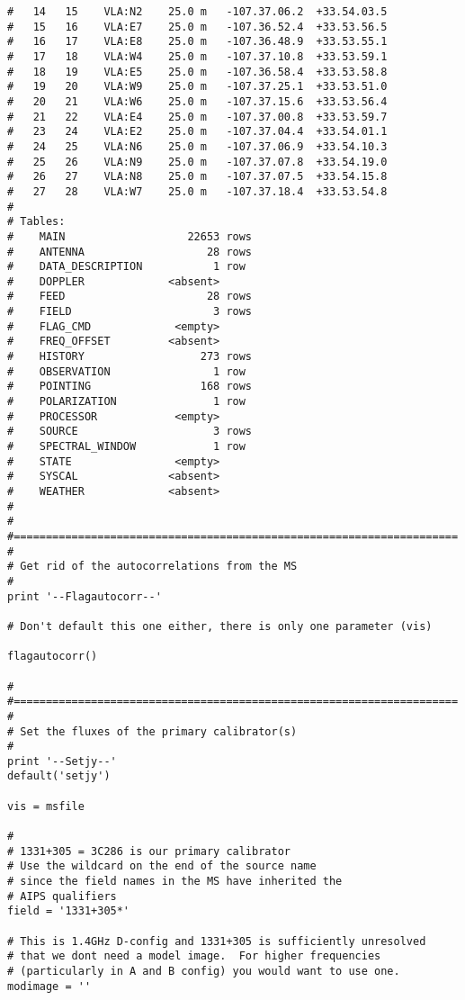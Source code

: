 \begin{verbatim}
#   14   15    VLA:N2    25.0 m   -107.37.06.2  +33.54.03.5  
#   15   16    VLA:E7    25.0 m   -107.36.52.4  +33.53.56.5  
#   16   17    VLA:E8    25.0 m   -107.36.48.9  +33.53.55.1  
#   17   18    VLA:W4    25.0 m   -107.37.10.8  +33.53.59.1  
#   18   19    VLA:E5    25.0 m   -107.36.58.4  +33.53.58.8  
#   19   20    VLA:W9    25.0 m   -107.37.25.1  +33.53.51.0  
#   20   21    VLA:W6    25.0 m   -107.37.15.6  +33.53.56.4  
#   21   22    VLA:E4    25.0 m   -107.37.00.8  +33.53.59.7  
#   23   24    VLA:E2    25.0 m   -107.37.04.4  +33.54.01.1  
#   24   25    VLA:N6    25.0 m   -107.37.06.9  +33.54.10.3  
#   25   26    VLA:N9    25.0 m   -107.37.07.8  +33.54.19.0  
#   26   27    VLA:N8    25.0 m   -107.37.07.5  +33.54.15.8  
#   27   28    VLA:W7    25.0 m   -107.37.18.4  +33.53.54.8  
# 
# Tables:
#    MAIN                   22653 rows     
#    ANTENNA                   28 rows     
#    DATA_DESCRIPTION           1 row      
#    DOPPLER             <absent>  
#    FEED                      28 rows     
#    FIELD                      3 rows     
#    FLAG_CMD             <empty>  
#    FREQ_OFFSET         <absent>  
#    HISTORY                  273 rows     
#    OBSERVATION                1 row      
#    POINTING                 168 rows     
#    POLARIZATION               1 row      
#    PROCESSOR            <empty>  
#    SOURCE                     3 rows     
#    SPECTRAL_WINDOW            1 row      
#    STATE                <empty>  
#    SYSCAL              <absent>  
#    WEATHER             <absent>  
# 
#
#=====================================================================
#
# Get rid of the autocorrelations from the MS
#
print '--Flagautocorr--'

# Don't default this one either, there is only one parameter (vis)

flagautocorr()

#
#=====================================================================
#
# Set the fluxes of the primary calibrator(s)
#
print '--Setjy--'
default('setjy')

vis = msfile

#
# 1331+305 = 3C286 is our primary calibrator
# Use the wildcard on the end of the source name
# since the field names in the MS have inherited the
# AIPS qualifiers
field = '1331+305*'

# This is 1.4GHz D-config and 1331+305 is sufficiently unresolved
# that we dont need a model image.  For higher frequencies
# (particularly in A and B config) you would want to use one.
modimage = ''


\end{verbatim}
